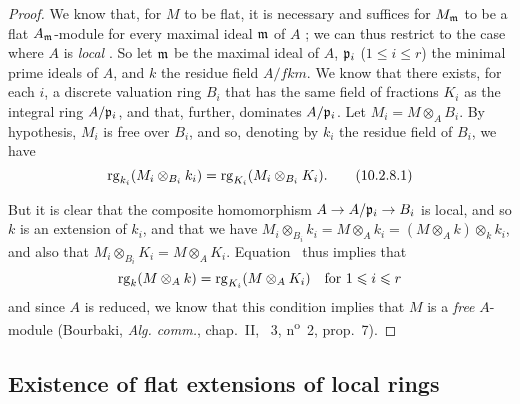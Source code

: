 \begin{proof}
\label{proof-0.10.2.8}
We know that, for $M$ to be flat, it is necessary and suffices for $M_\mathfrak{m}$ to be a flat $A_\mathfrak{m}$-module for every maximal ideal $\mathfrak{m}$ of $A$ ;
we can thus restrict to the case where $A$ is \emph{local} .
So let $\mathfrak{m}$ be the maximal ideal of $A$, $\mathfrak{p}_i$ ($1\leq i\leq r$) the minimal prime ideals of $A$, and $k$ the residue field $A/fk{m}$.
We know  that there exists, for each $i$, a discrete valuation ring $B_i$ that has the same field of fractions $K_i$ as the integral ring $A/\mathfrak{p}_i$, and that, further, dominates $A/\mathfrak{p}_i$.
Let $M_i=M\otimes_A B_i$.
By hypothesis, $M_i$ is free over $B_i$, and so, denoting by $k_i$ the residue field of $B_i$, we have
\begin{equation*}
\label{0.10.2.8.1}
    {\mathop{\mathrm{rg}}\nolimits}_{k_i}(M_i\otimes_{B_i}k_i) = {\mathop{\mathrm{rg}}\nolimits}_{K_i}(M_i\otimes_{B_i}K_i).\tag{10.2.8.1}
\end{equation*}

But it is clear that the composite homomorphism $A\to A/\fk{p}_i\to B_i$ is local, and so $k$ is an extension of $k_i$, and that we have $M_i\otimes_{B_i}k_i = M\otimes_A k_i = (M\otimes_A k)\otimes_k k_i$, and also that $M_i\otimes_{B_i}K_i = M\otimes_A K_i$.
Equation~ thus implies that
\[
    {\mathop{\mathrm{rg}}\nolimits}_k(M\otimes_A k) = {\mathop{\mathrm{rg}}\nolimits}_{K_i}(M\otimes_A K_i) \quad\mbox{for $1\leqslant i\leqslant r$}
\]
and since $A$ is reduced, we know that this condition implies that $M$ is a \emph{free} $A$-module (Bourbaki, \emph{Alg. comm.}, chap.~II, \textsection~3, n\textsuperscript{o}~2, prop.~7).
\end{proof}

\subsection{Existence of flat extensions of local rings}
\label{subsection:existence-of-flat-extensions-of-local-rings}
